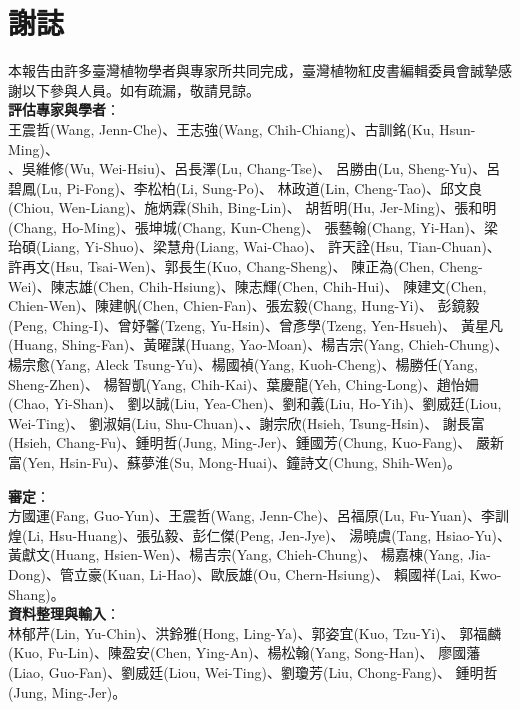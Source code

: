 \chapter{謝誌}

\linespread{1.1}\selectfont
本報告由許多臺灣植物學者與專家所共同完成，臺灣植物紅皮書編輯委員會誠摯感謝以下參與人員。如有疏漏，敬請見諒。 \\
\noindent \textbf{評估專家與學者}：\\
\noindent 王震哲(Wang, Jenn-Che)、王志強(Wang, Chih-Chiang)、古訓銘(Ku, Hsun-Ming)、\\
、吳維修(Wu, Wei-Hsiu)、呂長澤(Lu, Chang-Tse)、
呂勝由(Lu, Sheng-Yu)、呂碧鳳(Lu, Pi-Fong)、李松柏(Li, Sung-Po)、
林政道(Lin, Cheng-Tao)、邱文良(Chiou, Wen-Liang)、施炳霖(Shih, Bing-Lin)、
胡哲明(Hu, Jer-Ming)、張和明(Chang, Ho-Ming)、張坤城(Chang, Kun-Cheng)、
張藝翰(Chang, Yi-Han)、梁珆碩(Liang, Yi-Shuo)、梁慧舟(Liang, Wai-Chao)、
許天詮(Hsu, Tian-Chuan)、許再文(Hsu, Tsai-Wen)、郭長生(Kuo, Chang-Sheng)、
陳正為(Chen, Cheng-Wei)、陳志雄(Chen, Chih-Hsiung)、陳志輝(Chen, Chih-Hui)、
陳建文(Chen, Chien-Wen)、陳建帆(Chen, Chien-Fan)、張宏毅(Chang, Hung-Yi)、
彭鏡毅(Peng, Ching-I)、曾妤馨(Tzeng, Yu-Hsin)、曾彥學(Tzeng, Yen-Hsueh)、
黃星凡(Huang, Shing-Fan)、黃曜謀(Huang, Yao-Moan)、楊吉宗(Yang, Chieh-Chung)、
楊宗愈(Yang, Aleck Tsung-Yu)、楊國禎(Yang, Kuoh-Cheng)、楊勝任(Yang, Sheng-Zhen)、
楊智凱(Yang, Chih-Kai)、葉慶龍(Yeh, Ching-Long)、趙怡姍(Chao, Yi-Shan)、
劉以誠(Liu, Yea-Chen)、劉和義(Liu, Ho-Yih)、劉威廷(Liou, Wei-Ting)、
劉淑娟(Liu, Shu-Chuan)、、謝宗欣(Hsieh, Tsung-Hsin)、
謝長富(Hsieh, Chang-Fu)、鍾明哲(Jung, Ming-Jer)、鍾國芳(Chung, Kuo-Fang)、
嚴新富(Yen, Hsin-Fu)、蘇夢淮(Su, Mong-Huai)、鐘詩文(Chung, Shih-Wen)。

\noindent \textbf{審定}：\\
方國運(Fang, Guo-Yun)、王震哲(Wang, Jenn-Che)、呂福原(Lu, Fu-Yuan)、李訓煌(Li, Hsu-Huang)、張弘毅、彭仁傑(Peng, Jen-Jye)、
湯曉虞(Tang, Hsiao-Yu)、黃獻文(Huang, Hsien-Wen)、楊吉宗(Yang, Chieh-Chung)、
楊嘉棟(Yang, Jia-Dong)、管立豪(Kuan, Li-Hao)、歐辰雄(Ou, Chern-Hsiung)、
賴國祥(Lai, Kwo-Shang)。 \\

\noindent \textbf{資料整理與輸入}：\\
林郁芹(Lin, Yu-Chin)、洪鈴雅(Hong, Ling-Ya)、郭姿宜(Kuo, Tzu-Yi)、
郭福麟(Kuo, Fu-Lin)、陳盈安(Chen, Ying-An)、楊松翰(Yang, Song-Han)、
廖國藩(Liao, Guo-Fan)、劉威廷(Liou, Wei-Ting)、劉瓊芳(Liu, Chong-Fang)、
鍾明哲(Jung, Ming-Jer)。

\linespread{1}\selectfont
